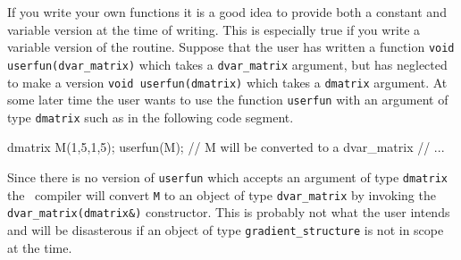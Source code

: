 \documentclass[12pt]{book}
\begin{document}
If you write your own functions it is a good idea to provide
both a constant and variable version at the time of writing.
This is especially true if you write a variable version of the
routine.
Suppose that the user has written a function 
\hbox{\tt void userfun(dvar\_matrix)}
which takes a \hbox{\tt dvar\_matrix} argument, but has neglected to
make a version \hbox{\tt void userfun(dmatrix)} which takes a 
{\tt dmatrix} argument. At some later time the user wants to
use the function {\tt userfun} with an argument of type
{\tt dmatrix} such as in the following code segment.
\beginexamplea
{
  dmatrix M(1,5,1,5);
  userfun(M); // M will be converted to a dvar_matrix
  // ...

}
\endexample
\noindent Since there is no version of {\tt userfun} which
accepts an argument of type {\tt dmatrix} the \cplus\ compiler
will convert {\tt M} to an object of type \hbox{\tt dvar\_matrix}
by invoking the \hbox{\tt dvar\_matrix(dmatrix\&)} constructor.
This is probably not what the user intends and will be disasterous
if an object of type {\tt gradient\_structure} is not in scope at the time. 
\end{document}
